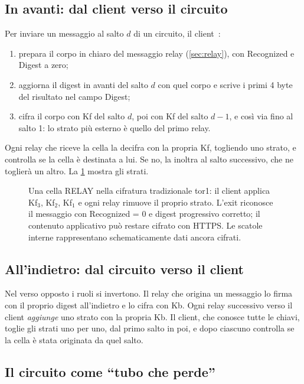 \subsection{In avanti: dal client verso il circuito}

Per inviare un messaggio al salto $d$ di un circuito, il client~:
\begin{enumerate}
  \item prepara il corpo in chiaro del messaggio relay (\cref{sec:relay}), con Recognized e Digest a zero;
  \item aggiorna il digest in avanti del salto $d$ con quel corpo e scrive i primi 4 byte del risultato nel campo Digest;
  \item cifra il corpo con Kf del salto $d$, poi con Kf del salto $d-1$, e così via fino al salto 1: lo strato più esterno è quello del primo relay.
\end{enumerate}
Ogni relay che riceve la cella la decifra con la propria Kf, togliendo uno strato, e controlla se la cella è destinata a lui. Se no, la inoltra al salto successivo, che ne toglierà un altro. La \cref{fig:cipolla} mostra gli strati.

\begin{figure}[htbp]
\centering

\caption{Una cella RELAY nella cifratura tradizionale tor1: il client applica Kf$_3$, Kf$_2$, Kf$_1$ e ogni relay rimuove il proprio strato. L'exit riconosce il messaggio con Recognized = 0 e digest progressivo corretto; il contenuto applicativo può restare cifrato con HTTPS. Le scatole interne rappresentano schematicamente dati ancora cifrati.}
\label{fig:cipolla}
\end{figure}

\subsection{All'indietro: dal circuito verso il client}

Nel verso opposto i ruoli si invertono. Il relay che origina un messaggio lo firma con il proprio digest all'indietro e lo cifra con Kb. Ogni relay successivo verso il client \emph{aggiunge} uno strato con la propria Kb. Il client, che conosce tutte le chiavi, toglie gli strati uno per uno, dal primo salto in poi, e dopo ciascuno controlla se la cella è stata originata da quel salto.

\subsection{Il circuito come \enquote{tubo che perde}}

